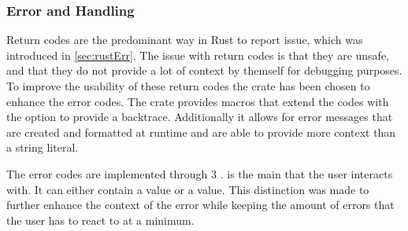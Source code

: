 \documentclass[thesis]{subfiles}
\begin{document}
    \subsubsection{Error and Handling}
      Return codes are the predominant way in Rust to report issue, which was introduced in \autoref{sec:rustErr}.
      The issue with return codes is that they are unsafe, and that they do not provide a lot of context by themself for debugging purposes.
      To improve the usability of these return codes the  crate\autocite{rust-failure} has been chosen to enhance the error codes.
      The crate provides macros that extend the codes with the option to provide a backtrace.
      Additionally it allows for error messages that are created and formatted at runtime and are able to provide more context than a string literal.

      The error codes are implemented through 3 \enums.
      \SkillFail is the main \enum that the user interacts with.
      It can either contain a  \enum value or a  \enum value.
      This distinction was made to further enhance the context of the error while keeping the amount of errors that the user has to react to at a minimum.
\end{document}
